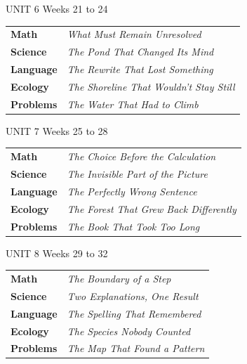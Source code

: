 \documentclass[10.5pt]{article}
\begin{document}
\begin{unitbox}{UNIT 6 \quad Weeks 21 to 24}
\begin{tabular}{@{}p{1.3in}p{2.5in}@{}}
\textcolor{hudorange}{\textbf{Math}} & \textit{What Must Remain Unresolved}\\
\textcolor{hudorange}{\textbf{Science}} & \textit{The Pond That Changed Its Mind}\\
\textcolor{hudorange}{\textbf{Language}} & \textit{The Rewrite That Lost Something}\\
\textcolor{hudorange}{\textbf{Ecology}} & \textit{The Shoreline That Wouldn't Stay Still}\\
\textcolor{hudorange}{\textbf{Problems}} & \textit{The Water That Had to Climb}\\
\end{tabular}
\end{unitbox}

\begin{unitbox}{UNIT 7 \quad Weeks 25 to 28}
\begin{tabular}{@{}p{1.3in}p{2.5in}@{}}
\textcolor{hudorange}{\textbf{Math}} & \textit{The Choice Before the Calculation}\\
\textcolor{hudorange}{\textbf{Science}} & \textit{The Invisible Part of the Picture}\\
\textcolor{hudorange}{\textbf{Language}} & \textit{The Perfectly Wrong Sentence}\\
\textcolor{hudorange}{\textbf{Ecology}} & \textit{The Forest That Grew Back Differently}\\
\textcolor{hudorange}{\textbf{Problems}} & \textit{The Book That Took Too Long}\\
\end{tabular}
\end{unitbox}

\begin{unitbox}{UNIT 8 \quad Weeks 29 to 32}
\begin{tabular}{@{}p{1.3in}p{2.5in}@{}}
\textcolor{hudorange}{\textbf{Math}} & \textit{The Boundary of a Step}\\
\textcolor{hudorange}{\textbf{Science}} & \textit{Two Explanations, One Result}\\
\textcolor{hudorange}{\textbf{Language}} & \textit{The Spelling That Remembered}\\
\textcolor{hudorange}{\textbf{Ecology}} & \textit{The Species Nobody Counted}\\
\textcolor{hudorange}{\textbf{Problems}} & \textit{The Map That Found a Pattern}\\
\end{tabular}
\end{unitbox}
\end{document}
